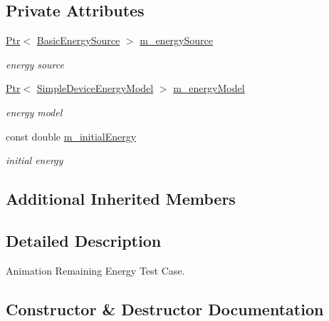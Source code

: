 \subsection*{Private Attributes}
\begin{DoxyCompactItemize}
\item 
\hyperlink{classns3_1_1Ptr}{Ptr}$<$ \hyperlink{classns3_1_1BasicEnergySource}{Basic\+Energy\+Source} $>$ \hyperlink{classAnimationRemainingEnergyTestCase_ab57a5fb126e09a5001d23ced08867778}{m\+\_\+energy\+Source}
\begin{DoxyCompactList}\small\item\em energy source \end{DoxyCompactList}\item 
\hyperlink{classns3_1_1Ptr}{Ptr}$<$ \hyperlink{classns3_1_1SimpleDeviceEnergyModel}{Simple\+Device\+Energy\+Model} $>$ \hyperlink{classAnimationRemainingEnergyTestCase_a992202ae075859acd996f44fd3396d68}{m\+\_\+energy\+Model}
\begin{DoxyCompactList}\small\item\em energy model \end{DoxyCompactList}\item 
const double \hyperlink{classAnimationRemainingEnergyTestCase_a2e8b91bd1e920bea38977402cd602b3c}{m\+\_\+initial\+Energy}
\begin{DoxyCompactList}\small\item\em initial energy \end{DoxyCompactList}\end{DoxyCompactItemize}
\subsection*{Additional Inherited Members}


\subsection{Detailed Description}
Animation Remaining Energy Test Case. 

\subsection{Constructor \& Destructor Documentation}
